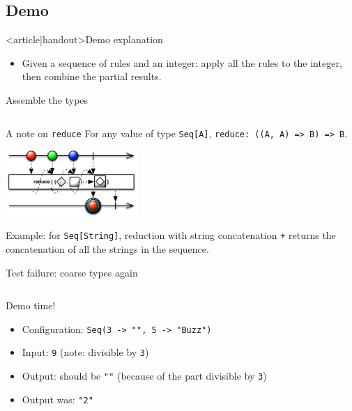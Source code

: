 \subsection{Demo}

\begin{frame}<article|handout>{Demo explanation}
  \begin{itemize}
  \item Given a sequence of rules and an integer: apply all the rules to the integer, then combine the partial results.
  \end{itemize}

\end{frame}

\begin{frame}[label=first-general,fragile]{Assemble the types}
  \inputminted[gobble=2]{scala}{FizzBuzz5.scala}
\end{frame}

\begin{frame}[fragile]{A note on \texttt{reduce}}
  For any value of type \texttt{Seq[A]}, \texttt{reduce: ((A, A) => B) => B}.
  \begin{center}
    \includegraphics[height=2.5cm]{reduce.png}
  \end{center}

  Example: for \texttt{Seq[String]}, reduction with string concatenation \texttt{+} returns the concatenation of all the strings in the sequence.
\end{frame}

\begin{frame}[fragile]{Test failure: coarse types again}
  \inputminted[gobble=2]{console}{testQuick9.console}

  \begin{block}{Demo time!}
    \begin{itemize}
    \item Configuration: \texttt{Seq(3 -> "", 5 -> "Buzz")}
    \item Input: \texttt{9} (note: divisible by \texttt{3})
    \item Output: should be \texttt{""} (because of the part divisible by \texttt{3})
    \item Output was: \texttt{"2"}
    \end{itemize}
  \end{block}
\end{frame}

